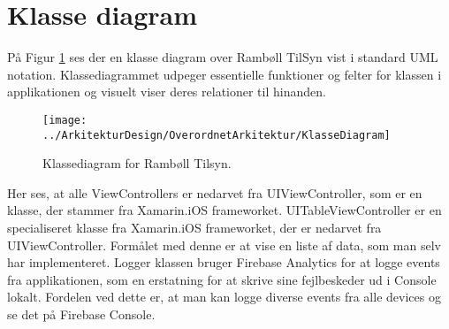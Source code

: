 \section{Klasse diagram}
På Figur \ref{fig:KlasseDiagram} ses der en klasse diagram over Rambøll TilSyn vist i standard UML notation\cite{UML}. Klassediagrammet udpeger essentielle funktioner og felter for klassen i applikationen og visuelt viser deres relationer til hinanden.

\begin{figure}[H] %
	\centering
	\texttt{[image: ../ArkitekturDesign/OverordnetArkitektur/KlasseDiagram]}
	\caption{Klassediagram for Rambøll Tilsyn.}
	\label{fig:KlasseDiagram}
\end{figure}

Her ses, at alle ViewControllers er nedarvet fra UIViewController\cite{UIViewController}, som er en klasse, der stammer fra Xamarin.iOS frameworket. UITableViewController er en specialiseret klasse fra Xamarin.iOS frameworket, der er nedarvet fra UIViewController. Formålet med denne er at vise en liste af data, som man selv har implementeret. Logger klassen bruger Firebase Analytics\cite{FirebaseAnalytic} for at logge events fra applikationen, som en erstatning for at skrive sine fejlbeskeder ud i Console lokalt\cite{CON}. Fordelen ved dette er, at man kan logge diverse events fra alle devices og se det på Firebase Console.  
